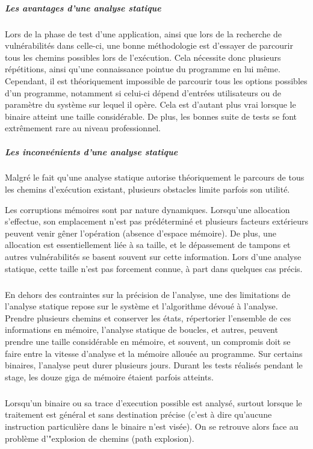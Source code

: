 \subparagraph{Les avantages d'une analyse statique}

Lors de la phase de test d'une application, ainsi que lors de la recherche de vulnérabilités dans celle-ci, une bonne méthodologie
est d'essayer de parcourir tous les chemins possibles lors de l'exécution. Cela nécessite donc plusieurs répétitions, ainsi qu'une connaissance
pointue du programme en lui même.\newline
Cependant, il est théoriquement impossible de parcourir tous les options possibles d'un programme, notamment si
celui-ci dépend d'entrées utilisateurs ou de paramètre du système sur lequel il opère. Cela est d'autant plus vrai lorsque le binaire atteint une taille
considérable. De plus, les bonnes suite de tests se font extrêmement rare au niveau professionnel.

\subparagraph{Les inconvénients d'une analyse statique}

Malgré le fait qu'une analyse statique autorise théoriquement le parcours de tous les chemins d'exécution existant, plusieurs obstacles
limite parfois son utilité.\newline

Les corruptions mémoires sont par nature dynamiques. Lorsqu'une allocation s'effectue, son emplacement n'est pas prédéterminé
et plusieurs facteurs extérieurs peuvent venir gêner l'opération (absence d'espace mémoire). De plus, une allocation
est essentiellement liée à sa taille, et le dépassement de tampons et autres vulnérabilités se basent souvent sur cette information.
Lors d'une analyse statique, cette taille n'est pas forcement connue, à part dans quelques cas précis.
\subparagraph{}

En dehors des contraintes sur la précision de l'analyse, une des limitations de l'analyse statique repose sur le système et l'algorithme
dévoué à l'analyse. Prendre plusieurs chemins et conserver les états, répertorier l'ensemble de ces informations en mémoire, l'analyse
statique de boucles, et autres, peuvent prendre une taille considérable en mémoire, et souvent, un compromis doit se faire entre la vitesse
d'analyse et la mémoire allouée au programme. Sur certains binaires, l'analyse peut durer plusieurs jours. Durant les tests réalisés pendant le
stage, les douze giga de mémoire étaient parfois atteints.

\subparagraph{}
Lorsqu'un binaire ou sa trace d'execution possible est analysé, surtout lorsque le traitement est général et sans destination précise (c'est à dire
qu'aucune instruction particulière dans le binaire n'est visée). On se retrouve alors face au problème d'"explosion de chemins (path explosion).

